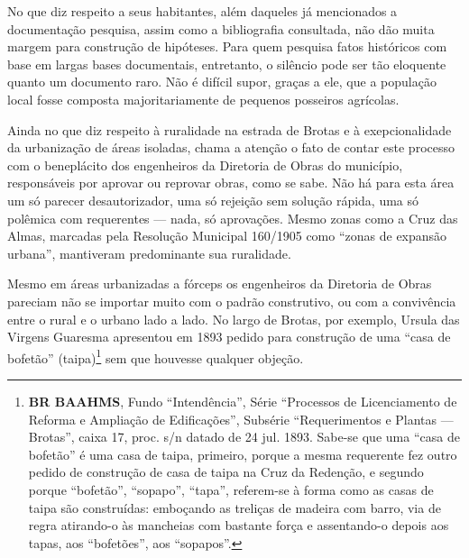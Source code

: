 
No que diz respeito a seus habitantes, além daqueles já mencionados a documentação pesquisa, assim como a bibliografia consultada, não dão muita margem para construção de hipóteses. Para quem pesquisa fatos históricos com base em largas bases documentais, entretanto, o silêncio pode ser tão eloquente quanto um documento raro. Não é difícil supor, graças a ele, que a população local fosse composta majoritariamente de pequenos posseiros agrícolas.


Ainda no que diz respeito à ruralidade na estrada de Brotas e à exepcionalidade da urbanização de áreas isoladas, chama a atenção o fato de contar este processo com o beneplácito dos engenheiros da Diretoria de Obras do município, responsáveis por aprovar ou reprovar obras, como se sabe. Não há para esta área um só parecer desautorizador, uma só rejeição sem solução rápida, uma só polêmica com requerentes --- nada, só aprovações. Mesmo zonas como a Cruz das Almas, marcadas pela Resolução Municipal 160/1905 como ``zonas de expansão urbana'', mantiveram predominante sua ruralidade.

Mesmo em áreas urbanizadas a fórceps os engenheiros da Diretoria de Obras pareciam não se importar muito com o padrão construtivo, ou com a convivência entre o rural e o urbano lado a lado. No largo de Brotas, por exemplo, Ursula das Virgens Guaresma apresentou em 1893 pedido para construção de uma ``casa de bofetão'' (taipa)\footnote{\textbf{BR BAAHMS}, Fundo ``Intendência'', Série ``Processos de Licenciamento de Reforma e Ampliação de Edificações'', Subsérie ``Requerimentos e Plantas --- Brotas'', caixa 17, proc. s/n datado de 24 jul. 1893. Sabe-se que uma ``casa de bofetão'' é uma casa de taipa, primeiro, porque a mesma requerente fez outro pedido de construção de casa de taipa na Cruz da Redenção, e segundo porque ``bofetão'', ``sopapo'', ``tapa'', referem-se à forma como as casas de taipa são construídas: emboçando as treliças de madeira com barro, via de regra atirando-o às mancheias com bastante força e assentando-o depois aos tapas, aos ``bofetões'', aos ``sopapos''.} sem que houvesse qualquer objeção.  

